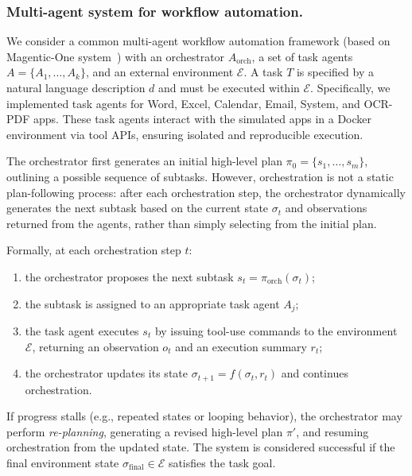 \documentclass[sigconf]{aamas}
\begin{document}
\subsubsection{Multi-agent system for workflow automation.}
We consider a common multi-agent workflow automation framework (based on Magentic-One system~\cite{fourney2024magentic}) with an orchestrator $A_{\text{orch}}$, a set of task agents $A = \{A_1, \ldots, A_k\}$, and an external environment $\mathcal{E}$. A task $T$ is specified by a natural language description $d$ and must be executed within $\mathcal{E}$. Specifically, we implemented task agents for Word, Excel, Calendar, Email, System, and OCR-PDF apps. These task agents interact with the simulated apps in a Docker environment via tool APIs, ensuring isolated and reproducible execution.

The orchestrator first generates an initial high-level plan $\pi_0 = \{s_1, \ldots, s_m\}$, outlining a possible sequence of subtasks. 
However, orchestration is not a static plan-following process: after each orchestration step, the orchestrator dynamically generates the next subtask based on the current state $\sigma_t$ and observations returned from the agents, rather than simply selecting from the initial plan. 

Formally, at each orchestration step $t$:
\begin{enumerate}
    \item the orchestrator proposes the next subtask $s_t = \pi_{\text{orch}}(\sigma_t)$;
    \item the subtask is assigned to an appropriate task agent $A_j$;
    \item the task agent executes $s_t$ by issuing tool-use commands to the environment $\mathcal{E}$, returning an observation $o_t$ and an execution summary $r_t$;
    \item the orchestrator updates its state $\sigma_{t+1} = f(\sigma_t, r_t)$ and continues orchestration.
\end{enumerate}

If progress stalls (e.g., repeated states or looping behavior), the orchestrator may perform \emph{re-planning}, generating a revised high-level plan $\pi'$, and resuming orchestration from the updated state. 
The system is considered successful if the final environment state $\sigma_{\text{final}} \in \mathcal{E}$ satisfies the task goal.
\end{document}
